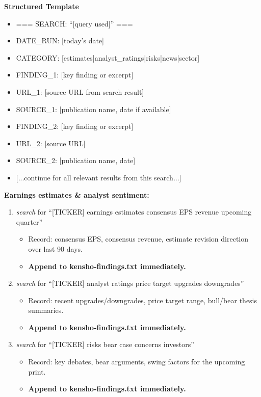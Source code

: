 \documentclass[11pt]{article}
\begin{document}
\textbf{Structured Template}
\begin{itemize}[leftmargin=*,itemsep=2pt,topsep=2pt]
\item {} === SEARCH: ``[query used]'' ===
\item {} DATE\_\allowbreak{}RUN: [today's date]
\item {} CATEGORY: [estimates|analyst\_\allowbreak{}ratings|risks|news|sector]
\item {} FINDING\_\allowbreak{}1: [key finding or excerpt]
\item {} URL\_\allowbreak{}1: [source URL from search result]
\item {} SOURCE\_\allowbreak{}1: [publication name, date if available]
\item {} FINDING\_\allowbreak{}2: [key finding or excerpt]
\item {} URL\_\allowbreak{}2: [source URL]
\item {} SOURCE\_\allowbreak{}2: [publication name, date]
\item {} [...continue for all relevant results from this search...]
\end{itemize}

\textbf{Earnings estimates \& analyst sentiment:}

\begin{enumerate}[leftmargin=*,itemsep=2pt,topsep=2pt]
\item {} \emph{search} for ``[TICKER] earnings estimates consensus EPS revenue upcoming quarter''
\begin{itemize}[leftmargin=*,itemsep=2pt,topsep=2pt]
\item {} Record: consensus EPS, consensus revenue, estimate revision direction over last 90 days.
\item {} \textbf{Append to kensho-findings.txt immediately.}
\end{itemize}
\item {} \emph{search} for ``[TICKER] analyst ratings price target upgrades downgrades''
\begin{itemize}[leftmargin=*,itemsep=2pt,topsep=2pt]
\item {} Record: recent upgrades/downgrades, price target range, bull/bear thesis summaries.
\item {} \textbf{Append to kensho-findings.txt immediately.}
\end{itemize}
\item {} \emph{search} for ``[TICKER] risks bear case concerns investors''
\begin{itemize}[leftmargin=*,itemsep=2pt,topsep=2pt]
\item {} Record: key debates, bear arguments, swing factors for the upcoming print.
\item {} \textbf{Append to kensho-findings.txt immediately.}
\end{itemize}
\end{enumerate}
\end{document}
